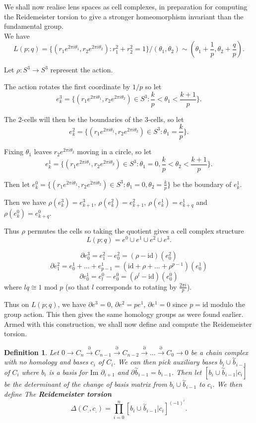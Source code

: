 \documentclass{article}
\newtheorem{definition}[theorem]{Definition}
\begin{document}
\noindent We shall now realise lens spaces as cell complexes, in preparation for computing the Reidemeister torsion to give a stronger homeomorphism invariant than the fundamental group.\\

\noindent We have
\[L(p;q)=\{(r_1e^{2\pi i\theta_1},r_2e^{2\pi i\theta_2}):r_1^2+r_2^2=1\}/(\theta_1,\theta_2)\sim(\theta_1+\frac{1}{p},\theta_2+\frac{q}{p}).\]

\noindent Let $\rho\colon S^3\to S^3$ represent the action.

\noindent The action rotates the first coordinate by $1/p$ so let \[e_k^3=\{(r_1e^{2\pi i\theta_1},r_2e^{2\pi i\theta_2})\in S^3:\frac{k}{p}<\theta_1<\frac{k+1}{p}\}.\]

\noindent The $2$-cells will then be the boundaries of the $3$-cells, so let \[e_k^2=\{(r_1e^{2\pi i\theta_1},r_2e^{2\pi i\theta_2})\in S^3:\theta_1=\frac{k}{p}\}.\]

\noindent Fixing $\theta_1$ leaves $r_2e^{2\pi i\theta_2}$ moving in a circle, so let \[e_k^1=\{(r_1e^{2\pi i\theta_1},r_2e^{2\pi i\theta_2})\in S^3:\theta_1=0,\frac{k}{p}<\theta_2<\frac{k+1}{p}\}.\]

\noindent Then let $e_k^0=\{(r_1e^{2\pi i\theta_1},r_2e^{2\pi i\theta_2})\in S^3:\theta_1=0,\theta_2=\frac{k}{p}\}$ be the boundary of $e_k^1$.

\noindent Then we have $\rho(e_k^3)=e_{k+1}^3$, $\rho(e_k^2)=e_{k+1}^2$, $\rho(e_k^1)=e_{k+q}^1$ and $\rho(e_k^0)=e_{k+q}^0$.

\noindent Thus $\rho$ permutes the cells so taking the quotient gives a cell complex structure \[L(p;q)=e^0\cup e^1\cup e^2\cup e^3.\]

\[\partial e_0^3=e_1^2-e_0^2=(\rho-\text{id})(e_0^2)\]
\[\partial e_1^2=e_0^1+...+e_{p-1}^1=(\text{id}+\rho+...+\rho^{p-1})(e_0^1)\]
\[\partial e_0^1=e_l^0-e_0^0=(\rho^l-\text{id})(e_0^0)\] where $lq\cong1\text{ mod }p$ (so that $l$ corresponds to rotating by $\frac{2\pi i}{p}$).

\noindent Thus on $L(p;q)$, we have $\partial e^3=0$, $\partial e^2=pe^1$, $\partial e^1=0$ since $p=\text{id}$ modulo the group action. This then gives the same homology groups as were found earlier.\\

\noindent Armed with this construction, we shall now define and compute the Reidemeister torsion.

\begin{definition}
Let $0\to C_n\overset{\partial}{\to}C_{n-1}\overset{\partial}{\to}C_{n-2}\overset{\partial}{\to}...\overset{\partial}{\to}C_{0}\to 0$ be a chain complex with no homology and bases $c_i$ of $C_i$. We can then pick auxiliary bases $b_i\cup\overset{\sim}{b}_{i-1}$ of $C_i$ where $b_i$ is a basis for $\text{Im }\partial_{i+1}$ and $\partial\overset{\sim}{b}_{i-1}=b_{i-1}$. Then let $[b_i\cup\overset{\sim}{b}_{i-1}|c_i]$ be the determinant of the change of basis matrix from $b_i\cup\overset{\sim}{b}_{i-1}$ to $c_i$. We then define The \textbf{Reidemeister torsion} \[\Delta(C_.,c_.)=\prod_{i=0}^n[b_i\cup\overset{\sim}{b}_{i-1}|c_i]^{(-1)^i}.\]
\end{definition}
\end{document}
